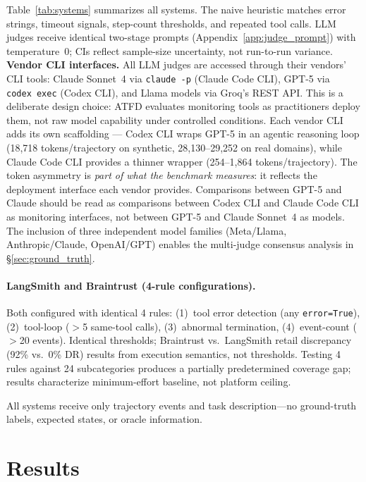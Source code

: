 \documentclass[11pt]{article}
\newcommand{\atfd}{\textsc{ATFD}\xspace}
\begin{document}
Table~\ref{tab:systems} summarizes all systems. The naive heuristic
matches error strings, timeout signals, step-count thresholds, and
repeated tool calls. LLM judges receive identical two-stage prompts
(Appendix~\ref{app:judge_prompt}) with temperature~0; CIs reflect
sample-size uncertainty, not run-to-run variance.
\textbf{Vendor CLI interfaces.} All LLM judges are accessed through their
vendors' CLI tools: Claude Sonnet~4 via \texttt{claude~-p} (Claude Code
CLI), GPT-5 via \texttt{codex~exec} (Codex CLI), and Llama models via
Groq's REST API. This is a deliberate design choice: \atfd evaluates
monitoring tools as practitioners deploy them, not raw model capability
under controlled conditions. Each vendor CLI adds its own scaffolding
--- Codex CLI wraps GPT-5 in an agentic reasoning loop (18,718
tokens/trajectory on synthetic, 28,130--29,252 on real domains), while
Claude Code CLI provides a thinner wrapper (254--1,864
tokens/trajectory). The token asymmetry is \emph{part of what the
benchmark measures}: it reflects the deployment interface each vendor
provides. Comparisons between GPT-5 and Claude should be read as
comparisons between Codex CLI and Claude Code CLI as monitoring
interfaces, not between GPT-5 and Claude Sonnet~4 as models.
The inclusion of three independent model families
(Meta/Llama, Anthropic/Claude, OpenAI/GPT) enables the multi-judge
consensus analysis in \S\ref{sec:ground_truth}.

\paragraph{LangSmith and Braintrust (4-rule configurations).}
Both configured with identical 4 rules: (1)~tool error detection (any
\texttt{error=True}), (2)~tool-loop ($>$5 same-tool calls),
(3)~abnormal termination, (4)~event-count ($>$20 events). Identical
thresholds; Braintrust vs.\ LangSmith retail discrepancy (92\% vs.\ 0\%
DR) results from execution semantics, not thresholds. Testing 4 rules
against 24 subcategories produces a partially predetermined coverage gap;
results characterize minimum-effort baseline, not platform ceiling.

All systems receive only trajectory events and task description---no
ground-truth labels, expected states, or oracle information.

\section{Results}
\label{sec:results}
\end{document}
